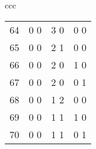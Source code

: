 {\begin{center}
\begin{tabular}{ccc}
\begin{tabular}{rccc}
64\hspace*{.125in}&0 0&3 0&0 0\\
65\hspace*{.125in}&0 0&2 1&0 0\\
66\hspace*{.125in}&0 0&2 0&1 0\\
67\hspace*{.125in}&0 0&2 0&0 1\\
68\hspace*{.125in}&0 0&1 2&0 0\\
69\hspace*{.125in}&0 0&1 1&1 0\\
70\hspace*{.125in}&0 0&1 1&0 1
\end{tabular}
\end{tabular}


\end{center}}
